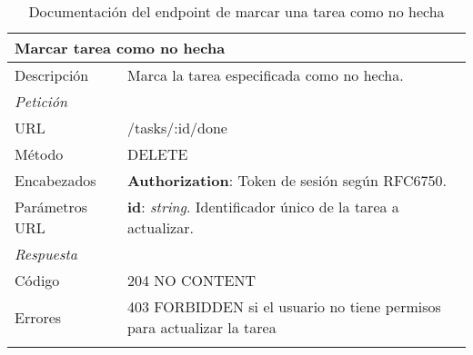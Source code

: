\begin{longtable}{|p{} p{}|}
    \hline
    \multicolumn{2}{|l|}{\textbf{Marcar tarea como no hecha}} \\ \hline 
    Descripción         & Marca la tarea especificada como no hecha. \\ \hline \hline
    \multicolumn{2}{|l|}{\emph{Petición}}  \\ \hline 
    URL      & /tasks/:id/done \\ \hline
    Método   & DELETE                  \\ \hline
    Encabezados  & 
    \textbf{Authorization}: Token de sesión según RFC6750. \\ \hline
    Parámetros URL  & 
    \textbf{id}: \emph{string}. Identificador único de la tarea a actualizar. \\ \hline \hline
    \multicolumn{2}{|l|}{\emph{Respuesta}} \\ \hline 
    Código          & 204 NO CONTENT          \\ \hline \hline
    Errores & 403 FORBIDDEN si el usuario no tiene permisos para actualizar la tarea
    \\ \hline
    \caption{Documentación del endpoint de marcar una tarea como no hecha}
    \label{api:marcar_tarea_no_hecha}
\end{longtable}

\newpage
